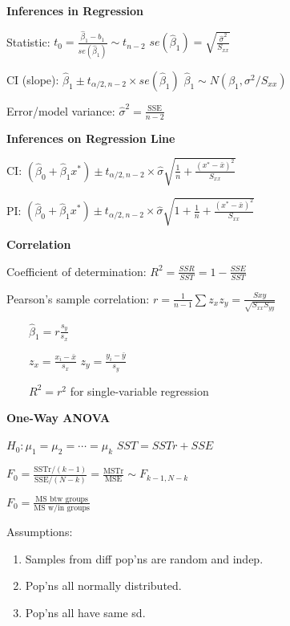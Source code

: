 \documentclass[twocolumn]{article}
\begin{document}
\vspace{-.5em}
\dotfill

\textbf{Inferences in Regression}

Statistic: $t_0 = \frac{\hat{\beta}_1 - b_1}{se(\hat{\beta}_1)} \sim t_{n-2}$ \hfill $se(\hat{\beta}_1) = \sqrt{\frac{\hat{\sigma}^2}{S_{xx}}}$

CI (slope): $\hat{\beta}_1 \pm t_{\alpha/2, n-2} \times se(\hat{\beta}_1)$ \hfill $\hat{\beta}_1 \sim N(\beta_1, \sigma^2 / S_{xx})$

Error/model variance: $\hat{\sigma}^2 = \frac{\text{SSE}}{n-2}$

\dotfill

\textbf{Inferences on Regression Line}

CI: $(\hat{\beta}_0 + \hat{\beta}_1 x^*) \pm t_{\alpha/2, n-2} \times \hat{\sigma} \sqrt{\frac{1}{n} + \frac{(x^* - \bar{x})^2}{S_{xx}}}$

PI: $(\hat{\beta}_0 + \hat{\beta}_1 x^*) \pm t_{\alpha/2, n-2} \times \hat{\sigma} \sqrt{1 + \frac{1}{n} + \frac{(x^* - \bar{x})^2}{S_{xx}}}$


\newpage


\textbf{Correlation}

Coefficient of determination: $R^2 = \frac{SSR}{SST} = 1 - \frac{SSE}{SST}$

Pearson's sample correlation: $r = \frac{1}{n-1} \sum z_x z_y = \frac{S{xy}}{\sqrt{S_{xx} S_{yy}}}$

$\quad\quad \hat{\beta}_1 = r \frac{s_y}{s_x}$

$\quad\quad z_x = \frac{x_i - \bar{x}}{s_x}$ \hspace{3em} $z_y = \frac{y_i - \bar{y}}{s_y}$

$\quad\quad R^2 = r^2$ for single-variable regression

\vspace{-.5em}
\dotfill

\textbf{One-Way ANOVA}

$H_0: \mu_1 = \mu_2 = \cdots = \mu_k$ \hfill $SST = SSTr + SSE$

$F_0 = \frac{\text{SSTr}/(k-1)}{\text{SSE}/(N-k)} = \frac{\text{MSTr}}{\text{MSE}} \sim F_{k-1,N-k}$

$F_0 = \frac{\text{MS btw groups}}{\text{MS w/in groups}}$

Assumptions:
\vspace{-.5em}
\begin{enumerate}
    \item Samples from diff pop'ns are random and indep.
    \item Pop'ns all normally distributed.
    \item Pop'ns all have same sd.
\end{enumerate}
\end{document}
